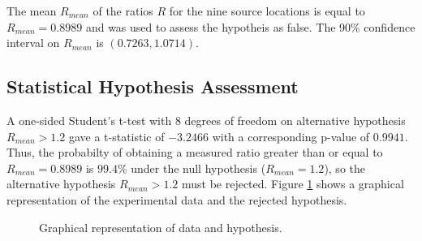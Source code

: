 \documentclass[submit, 12pt]{aiaa-pretty-modified}
\begin{document}
The mean $R_{mean}$ of the ratios $R$ for the nine source locations is equal to
$R_{mean} = 0.8989$ and was used to assess the hypotheis as false. The
90\% confidence interval on $R_{mean}$ is $(0.7263, 1.0714)$.

\subsection{Statistical Hypothesis Assessment}
A one-sided Student's t-test with 8 degrees of freedom on alternative
hypothesis $R_{mean} > 1.2$ gave a t-statistic of $-3.2466$ with a
corresponding p-value of $0.9941$.  Thus, the probabilty of
obtaining a measured ratio greater than or equal to $R_{mean} = 0.8989$
is $99.4\%$ under the null hypothesis ($R_{mean} = 1.2$), so the
alternative hypothesis $R_{mean} > 1.2$ must be rejected.  Figure
\ref{fig:killer} shows a graphical representation of the experimental
data and the rejected hypothesis.

\begin{figure}
\begin{center}
\caption{Graphical representation of data and hypothesis.}
\label{fig:killer}
\end{center}
\end{figure}
\end{document}
